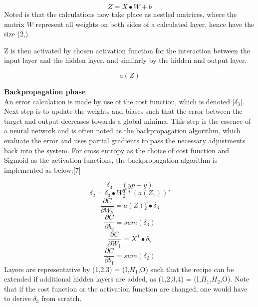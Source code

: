     \begin{equation}
       Z =   X \bullet W + b
    \end{equation}
Noted is that the calculations now take place as nestled matrices, where the matrix \textbf{$W$} represent all weights on both sides of a calculated layer, hence have the size (2,).\\
\par

Z is then activated by chosen activation function for the interaction between the input layer and the hidden layer, and similarly by the hidden and output layer.

    \begin{equation}
       a(Z)
    \end{equation}

\textbf{Backpropagation phase}\\

An error calculation is made by use of the cost function, which is denoted [$\delta_3$]. Next step is to update the weights and biases such that the error between the target and output decreases towards a global minima. This step is the essence of a neural network and is often noted as the backpropagation algorithm, which evaluate the error and uses partial gradients to pass the necessary adjustments back into the system. For cross entropy as the choice of cost function and Sigmoid as the activation functions, the backpropagation algorithm is implemented as below:[7]
\\
\par
    \begin{equation}
       \delta_3 = (yp-y) 
    \end{equation}
    \begin{equation}
       \delta_2 = \delta_3 \bullet W{_2^T} * (a(Z_1))' 
    \end{equation}
    \begin{equation}
       \frac{\partial C}{\partial W_2}  = a(Z){_2^T} \bullet \delta_3
    \end{equation}
    \begin{equation}
       \frac{\partial C}{\partial b_2}  = sum(\delta_3)
    \end{equation}
    \begin{equation}
       \frac{\partial C}{\partial W_1}  = X^T \bullet \delta_2
    \end{equation}
    \begin{equation}
       \frac{\partial C}{\partial b_1}  = sum(\delta_2)
    \end{equation}
Layers are representative by (1,2,3) = (I,$H_1$,O) such that the recipe can be extended if additional hidden layers are added, as (1,2,3,4) = (I,$H_1$,$H_2$,O). Note that if the cost function or the activation function are changed, one would have to derive $\delta_3$ from scratch.
\\
\par

